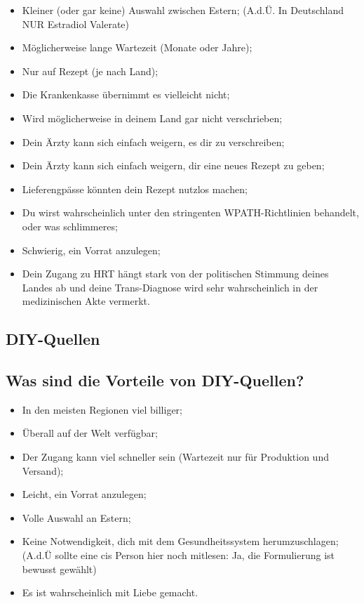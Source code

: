 \documentclass{article}
\begin{document}
\begin{itemize}
  \item Kleiner (oder gar keine) Auswahl zwischen Estern; (A.d.Ü. In Deutschland NUR Estradiol Valerate)
  \item Möglicherweise lange Wartezeit (Monate oder Jahre); 
  \item Nur auf Rezept (je nach Land);
  \item Die Krankenkasse übernimmt es vielleicht nicht;
  \item Wird möglicherweise in deinem Land gar nicht verschrieben;
  \item Dein Ärzty kann sich einfach weigern, es dir zu verschreiben;
  \item Dein Ärzty kann sich einfach weigern, dir eine neues Rezept zu geben;
  \item Lieferengpässe könnten dein Rezept nutzlos machen;
  \item Du wirst wahrscheinlich unter den stringenten WPATH-Richtlinien behandelt, oder was schlimmeres;
  \item Schwierig, ein Vorrat anzulegen;
  \item Dein Zugang zu HRT hängt stark von der politischen Stimmung deines Landes ab und deine Trans-Diagnose wird sehr wahrscheinlich in der medizinischen Akte vermerkt. 
\end{itemize}

\subsection*{DIY-Quellen}

\subsection{Was sind die Vorteile von DIY-Quellen?}

\begin{itemize}
\item In den meisten Regionen viel billiger;
\item Überall auf der Welt verfügbar;
\item Der Zugang kann viel schneller sein (Wartezeit nur für Produktion und Versand);
\item Leicht, ein Vorrat anzulegen;
\item Volle Auswahl an Estern;
\item Keine Notwendigkeit, dich mit dem Gesundheitssystem herumzuschlagen; (A.d.Ü sollte eine cis Person hier noch mitlesen: Ja, die Formulierung ist bewusst gewählt)
\item Es ist wahrscheinlich mit Liebe gemacht.
\end{itemize}
\end{document}
